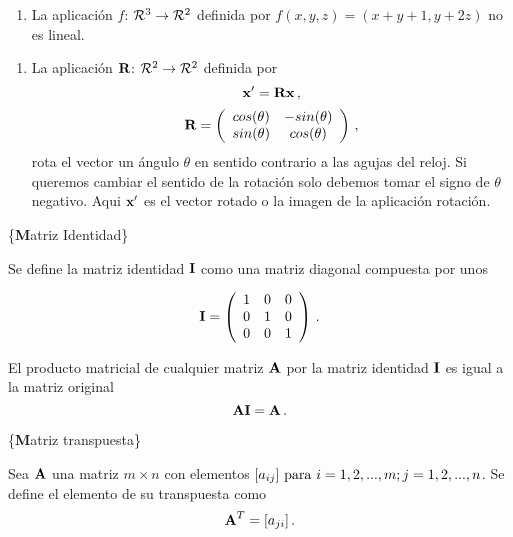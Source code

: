 \documentclass[
]{agujournal2019}
\providecommand{\tightlist}{%
  \setlength{\itemsep}{0pt}\setlength{\parskip}{0pt}}\usepackage{longtable,booktabs,array}
\begin{document}
\begin{enumerate}
\def\labelenumi{(\arabic{enumi})}
\setcounter{enumi}{1}
\tightlist
\item
  La aplicación \(f\): \({\cal R}^3 \rightarrow {\cal R}^2\) definida
  por \(f(x,y,z)=(x+y+1,y+2z)\) no es lineal.
\end{enumerate}

\vspace{0.5cm}

\begin{enumerate}
\def\labelenumi{(\arabic{enumi})}
\setcounter{enumi}{2}
\tightlist
\item
  La aplicación \({\textbf R}\): \({\cal R}^2 \rightarrow {\cal R}^2\)
  definida por \[{\textbf x}'={\textbf R}{\textbf x}\,,\]
  \[{\textbf R}=\left( \begin{array}{cc}
   cos(\theta) & -sin(\theta)\\
   sin(\theta) & cos(\theta)
     \end{array} \right)\,,\] rota el vector un ángulo \(\theta\) en
  sentido contrario a las agujas del reloj. Si queremos cambiar el
  sentido de la rotación solo debemos tomar el signo de \(\theta\)
  negativo. Aqui \({\textbf x}'\) es el vector rotado o la imagen de la
  aplicación rotación.
\end{enumerate}

\vspace{0.5cm}

\{\noindent \textbf Matriz Identidad\}

Se define la matriz identidad \({\textbf I}\) como una matriz diagonal
compuesta por unos

\[{\textbf I}=\left(\begin{array}{ccc}
  1 & 0 & 0\\
  0 & 1 & 0\\
  0 & 0 & 1
\end{array}\right)\,.\]

El producto matricial de cualquier matriz \({\textbf A}\) por la matriz
identidad \({\textbf I}\) es igual a la matriz original
\[{\textbf A}{\textbf I}={\textbf A}\,.\]

\vspace{0.5cm}

\{\noindent \textbf Matriz transpuesta\}

Sea \({\textbf A}\) una matriz \(m\times n\) con elementos
\([a_{ij}]\,\,{\rm para}\,\,i=1,2,...,m; j=1,2,...,n\). Se define el
elemento de su transpuesta como \[{\textbf A}^T=[a_{ji}]\,.\]
\end{document}

